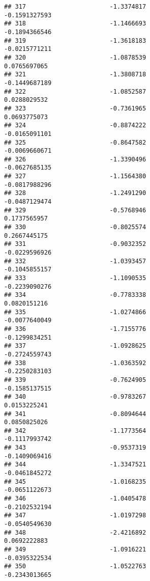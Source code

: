 \documentclass[
]{article}
\begin{document}
\begin{verbatim}
## 317                       -1.3374817                         -0.1591327593
## 318                       -1.1466693                         -0.1894366546
## 319                       -1.3618183                         -0.0215771211
## 320                       -1.0878539                          0.0765697065
## 321                       -1.3808718                         -0.1449687189
## 322                       -1.0852587                          0.0288029532
## 323                       -0.7361965                          0.0693775073
## 324                       -0.8874222                         -0.0165091101
## 325                       -0.8647582                         -0.0069660671
## 326                       -1.3390496                         -0.0627685135
## 327                       -1.1564380                         -0.0817988296
## 328                       -1.2491290                         -0.0487129474
## 329                       -0.5768946                          0.1737565957
## 330                       -0.8025574                          0.2667445175
## 331                       -0.9032352                         -0.0229596926
## 332                       -1.0393457                         -0.1045855157
## 333                       -1.1090535                         -0.2239090276
## 334                       -0.7783338                          0.0820151216
## 335                       -1.0274866                         -0.0077640049
## 336                       -1.7155776                         -0.1299834251
## 337                       -1.0928625                         -0.2724559743
## 338                       -1.0363592                         -0.2250283103
## 339                       -0.7624905                         -0.1585137515
## 340                       -0.9783267                          0.0153225241
## 341                       -0.8094644                          0.0850825026
## 342                       -1.1773564                         -0.1117993742
## 343                       -0.9537319                         -0.1409069416
## 344                       -1.3347521                         -0.0461845272
## 345                       -1.0168235                         -0.0651122673
## 346                       -1.0405478                         -0.2102532194
## 347                       -1.0197298                         -0.0540549630
## 348                       -2.4216892                          0.0692222883
## 349                       -1.0916221                         -0.0395322534
## 350                       -1.0522763                         -0.2343013665

\end{verbatim}
\end{document}
